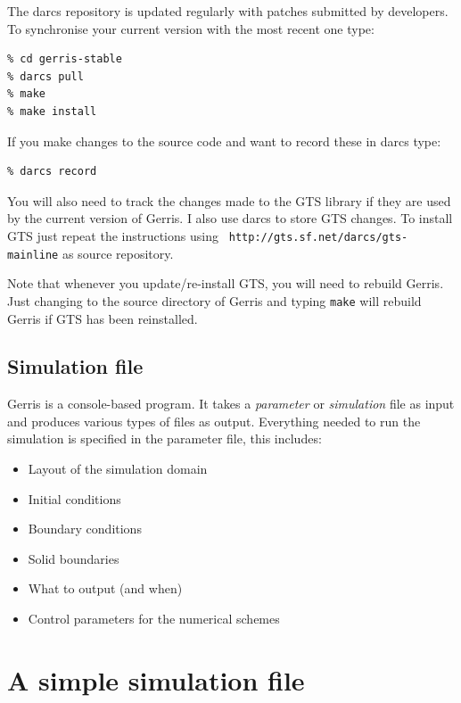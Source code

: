 \documentclass[a4paper]{article}
\begin{document}
The darcs repository is updated regularly with patches submitted by
developers. To synchronise your current version with the most recent
one type:
\begin{verbatim}
% cd gerris-stable
% darcs pull
% make
% make install
\end{verbatim}

If you make changes to the source code and want to record these in darcs type:
\begin{verbatim}
% darcs record
\end{verbatim}

You will also need to track the changes made to the GTS library if they
are used by the current version of Gerris. I also use darcs to store
GTS changes. To install GTS just repeat the instructions using {\tt
  http://gts.sf.net/darcs/gts-mainline} as source repository.

Note that whenever you update/re-install GTS, you will need to rebuild
Gerris. Just changing to the source directory of Gerris and typing
{\tt make} will rebuild Gerris if GTS has been reinstalled.

\subsection{Simulation file}

Gerris is a console-based program. It takes a {\em parameter} or {\em
simulation} file as input and produces various types of files as output.
Everything needed to run the simulation is specified in the parameter
file, this includes:
\begin{itemize}
\item Layout of the simulation domain
\item Initial conditions
\item Boundary conditions
\item Solid boundaries
\item What to output (and when)
\item Control parameters for the numerical schemes
\end{itemize}

\section{A simple simulation file}
\end{document}
